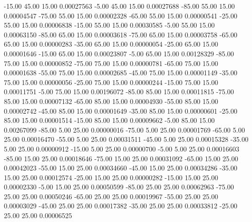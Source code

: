     -15.00     45.00     15.00     0.00027563
     -5.00     45.00     15.00     0.00027688
    -85.00     55.00     15.00     0.00004547
    -75.00     55.00     15.00     0.00002328
    -65.00     55.00     15.00     0.00000541
    -25.00     55.00     15.00     0.00006838
    -15.00     55.00     15.00     0.00030585
     -5.00     55.00     15.00     0.00063150
    -85.00     65.00     15.00     0.00003618
    -75.00     65.00     15.00     0.00003758
    -65.00     65.00     15.00     0.00000283
    -35.00     65.00     15.00     0.00000054
    -25.00     65.00     15.00     0.00001646
    -15.00     65.00     15.00     0.00023807
     -5.00     65.00     15.00     0.00128329
    -85.00     75.00     15.00     0.00000852
    -75.00     75.00     15.00     0.00000781
    -65.00     75.00     15.00     0.00001638
    -55.00     75.00     15.00     0.00002685
    -45.00     75.00     15.00     0.00001149
    -35.00     75.00     15.00     0.00000056
    -25.00     75.00     15.00     0.00000244
    -15.00     75.00     15.00     0.00011751
     -5.00     75.00     15.00     0.00196072
    -85.00     85.00     15.00     0.00011815
    -75.00     85.00     15.00     0.00007132
    -65.00     85.00     15.00     0.00004930
    -55.00     85.00     15.00     0.00002742
    -45.00     85.00     15.00     0.00001649
    -35.00     85.00     15.00     0.00000601
    -25.00     85.00     15.00     0.00001514
    -15.00     85.00     15.00     0.00009662
     -5.00     85.00     15.00     0.00267099
    -85.00      5.00     25.00     0.00000016
    -75.00      5.00     25.00     0.00001769
    -65.00      5.00     25.00     0.00016470
    -55.00      5.00     25.00     0.00031511
    -45.00      5.00     25.00     0.00015328
    -35.00      5.00     25.00     0.00000912
    -15.00      5.00     25.00     0.00000700
     -5.00      5.00     25.00     0.00016603
    -85.00     15.00     25.00     0.00018646
    -75.00     15.00     25.00     0.00031092
    -65.00     15.00     25.00     0.00042023
    -55.00     15.00     25.00     0.00034660
    -45.00     15.00     25.00     0.00034286
    -35.00     15.00     25.00     0.00012574
    -25.00     15.00     25.00     0.00000282
    -15.00     15.00     25.00     0.00002330
     -5.00     15.00     25.00     0.00050599
    -85.00     25.00     25.00     0.00062963
    -75.00     25.00     25.00     0.00050246
    -65.00     25.00     25.00     0.00019967
    -55.00     25.00     25.00     0.00003029
    -45.00     25.00     25.00     0.00017382
    -35.00     25.00     25.00     0.00033812
    -25.00     25.00     25.00     0.00006525

